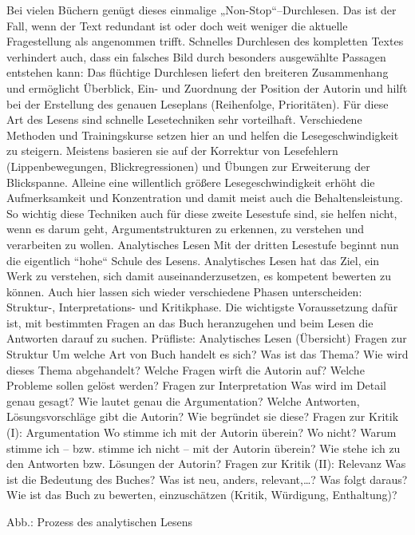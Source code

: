 \documentclass[]{book}
\theoremstyle{definition}
\theoremstyle{definition}
\theoremstyle{definition}
\theoremstyle{remark}
\begin{document}
Bei vielen Büchern genügt dieses einmalige „Non-Stop``--Durchlesen. Das
ist der Fall, wenn der Text redundant ist oder doch weit weniger die
aktuelle Fragestellung als angenommen trifft. Schnelles Durchlesen des
kompletten Textes verhindert auch, dass ein falsches Bild durch
besonders ausgewählte Passagen entstehen kann: Das flüchtige Durchlesen
liefert den breiteren Zusammenhang und ermöglicht Überblick, Ein- und
Zuordnung der Position der Autorin und hilft bei der Erstellung des
genauen Leseplans (Reihenfolge, Prioritäten). Für diese Art des Lesens
sind schnelle Lesetechniken sehr vorteilhaft. Verschiedene Methoden und
Trainingskurse setzen hier an und helfen die Lesegeschwindigkeit zu
steigern. Meistens basieren sie auf der Korrektur von Lesefehlern
(Lippenbewegungen, Blickregressionen) und Übungen zur Erweiterung der
Blickspanne. Alleine eine willentlich größere Lesegeschwindigkeit erhöht
die Aufmerksamkeit und Konzentration und damit meist auch die
Behaltensleistung. So wichtig diese Techniken auch für diese zweite
Lesestufe sind, sie helfen nicht, wenn es darum geht, Argumentstrukturen
zu erkennen, zu verstehen und verarbeiten zu wollen. Analytisches Lesen
Mit der dritten Lesestufe beginnt nun die eigentlich ``hohe`` Schule des
Lesens. Analytisches Lesen hat das Ziel, ein Werk zu verstehen, sich
damit auseinanderzusetzen, es kompetent bewerten zu können. Auch hier
lassen sich wieder verschiedene Phasen unterscheiden: Struktur-,
Interpretations- und Kritikphase. Die wichtigste Voraussetzung dafür
ist, mit bestimmten Fragen an das Buch heranzugehen und beim Lesen die
Antworten darauf zu suchen. Prüfliste: Analytisches Lesen (Übersicht)
Fragen zur Struktur Um welche Art von Buch handelt es sich? Was ist das
Thema? Wie wird dieses Thema abgehandelt? Welche Fragen wirft die
Autorin auf? Welche Probleme sollen gelöst werden? Fragen zur
Interpretation Was wird im Detail genau gesagt? Wie lautet genau die
Argumentation? Welche Antworten, Lösungsvorschläge gibt die Autorin? Wie
begründet sie diese? Fragen zur Kritik (I): Argumentation Wo stimme ich
mit der Autorin überein? Wo nicht? Warum stimme ich -- bzw. stimme ich
nicht -- mit der Autorin überein? Wie stehe ich zu den Antworten bzw.
Lösungen der Autorin? Fragen zur Kritik (II): Relevanz Was ist die
Bedeutung des Buches? Was ist neu, anders, relevant,\ldots{}? Was folgt
daraus? Wie ist das Buch zu bewerten, einzuschätzen (Kritik, Würdigung,
Enthaltung)?

Abb.: Prozess des analytischen Lesens
\end{document}
